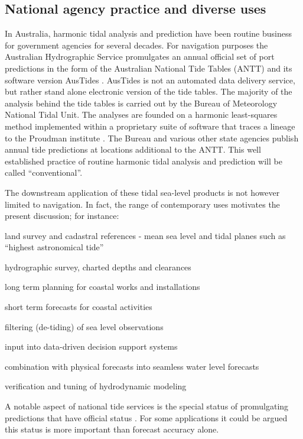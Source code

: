 \subsection{National agency practice and diverse uses}
In Australia, harmonic tidal analysis and prediction have been routine business for government agencies for several decades.  For navigation purposes the Australian Hydrographic Service promulgates an annual official set of port predictions in the form of the Australian National Tide Tables (ANTT) and its software version AusTides \citep{austides}.  AusTides is not an automated data delivery service, but rather stand alone electronic version of the tide tables.  
The majority of the analysis behind the tide tables is carried out by the Bureau of Meteorology National Tidal Unit.  
The analyses are founded on a harmonic least-squares method implemented within a proprietary suite of software that traces a lineage to the Proudman institute \citep{MHL2156}.    
The Bureau and various other state agencies publish annual tide predictions at locations additional to the ANTT. 
This well established practice of routine harmonic tidal analysis and prediction will be called ``conventional''.


The downstream application of these tidal sea-level products is not however limited to navigation.   
In fact, the range of contemporary uses motivates the present discussion; for instance:
\begin{inparaenum}[1)]
    \item land survey and cadastral references - mean sea level and tidal planes such as ``highest astronomical tide'' 
    \item hydrographic survey, charted depths and clearances
    \item long term planning for coastal works and installations
    \item short term forecasts for coastal activities 
    \item filtering (de-tiding) of sea level observations
    \item input into data-driven decision support systems
    \item combination with physical forecasts into seamless water level forecasts 
    \item verification and tuning of hydrodynamic modeling
\end{inparaenum}

A notable aspect of national tide services is the special status of promulgating predictions that have official status \citep{AusNavAct2012}.   For some applications it could be argued this status is more important than forecast accuracy alone.
  

